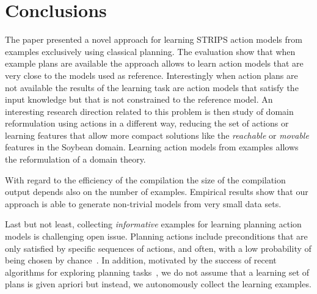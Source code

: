 \documentclass[letterpaper]{article} %
\begin{document}
\section{Conclusions}
The paper presented a novel approach for learning STRIPS action models from examples exclusively using classical planning. The evaluation show that when example plans are available the approach allows to learn action models that are very close to the models used as reference. Interestingly when action plans are not available the results of the learning task are action models that satisfy the input knowledge but that is not constrained to the reference model. An interesting research direction related to this problem is then study of domain reformulation using actions in a different way, reducing the set of actions or learning features that allow more compact solutions like the {\em reachable} or {\em movable} features in the Soybean domain. Learning action models from examples allows the reformulation of a domain theory.

With regard to the efficiency of the compilation the size of the compilation output depends also on the number of examples. Empirical results show that our approach is able to generate non-trivial models from very small data sets.

Last but not least, collecting {\em informative} examples for learning planning action models is challenging open issue. Planning actions include preconditions that are only satisfied by specific sequences of actions, and often, with a low probability of being chosen by chance~\cite{fern2004learning}. In addition, motivated by the success of recent algorithms for exploring planning tasks~\cite{geffner:pwithsimulators:IJCAI17}, we do not assume that a learning set of plans is given apriori but instead, we autonomously collect the learning examples.

\newpage



\end{document}
